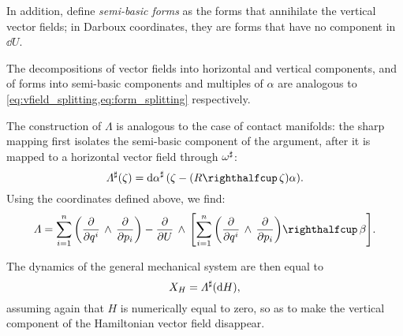 In addition, define \emph{semi-basic forms} as the forms that annihilate the vertical vector fields; in Darboux coordinates, they are forms that have no component in \(\dd{U}\).

The decompositions of vector fields into horizontal and vertical components, and of forms into semi-basic components and multiples of \(\alpha\) are analogous to \cref{eq:vfield_splitting,eq:form_splitting} respectively.

The construction of \(\Lambda\) is analogous to the case of contact manifolds: the sharp mapping first isolates the semi-basic component of the argument, after it is mapped to a horizontal vector field through \(\omega^\sharp\):
\begin{equation}
     \fromDual{\Lambda}(\zeta) = \fromDual{\dd{\alpha}}\qty(\zeta - (\intpr{R}{\zeta})\alpha).
\end{equation}
Using the coordinates defined above, we find:
\begin{equation}
    \Lambda = \sum_{i=1}^n \qty(\wedgep{\pdv{}{q^i}}{\pdv{}{p_i}}) - \wedgep{\pdv{}{U}}{\qty[\intpr{\sum_{i=1}^n \qty(\wedgep{\pdv{}{q^i}}{\pdv{}{p_i}})}{\beta}]}.
    \label{eq:general_bivector}
\end{equation}

The dynamics of the general mechanical system are then equal to 
\begin{equation} 
    X_H = \Lambda^\sharp(\dd{H}), 
    \label{eq:general_isomorphism}
\end{equation}
assuming again that \(H\) is numerically equal to zero, so as to make the vertical component of the Hamiltonian vector field disappear. 

